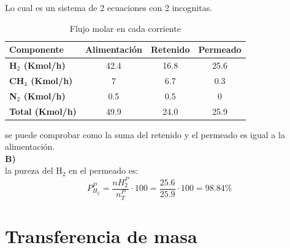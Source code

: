\documentclass{report}
\begin{document}
Lo cual es un sistema de 2 ecuaciones con 2 incognitas.\\
\begin{table}[h]
    \centering
    \renewcommand{\arraystretch}{1.2}  %
    \begin{tabular}{lccc}
        \toprule
        \textbf{Componente} & \textbf{Alimentación} & \textbf{Retenido} & \textbf{Permeado} \\
        \midrule
        \textbf{H$_2$ (Kmol/h)} & 42.4 & 16.8 & 25.6 \\
        \textbf{CH$_4$ (Kmol/h)} & 7  & 6.7 & 0.3\\
        \textbf{N$_2$ (Kmol/h)} & 0.5 & 0.5 & 0 \\
        \midrule
        \textbf{Total (Kmol/h)} & 49.9 & 24.0 & 25.9 \\
        \bottomrule
    \end{tabular}
    \caption{Flujo molar en cada corriente}
\end{table}

\noindent se puede comprobar como la suma del retenido y el permeado es igual a la alimentación.\\

\noindent \textbf{B)}\\

\noindent la pureza del H$_2$ en el permeado es:
\begin{equation*}
	P_{H_2}^P = \frac{nH_2^P}{n_T^P} \cdot 100 = \frac{25.6}{25.9} \cdot 100 = 98.84\%
\end{equation*}
\chapter{Transferencia de masa}
\end{document}
